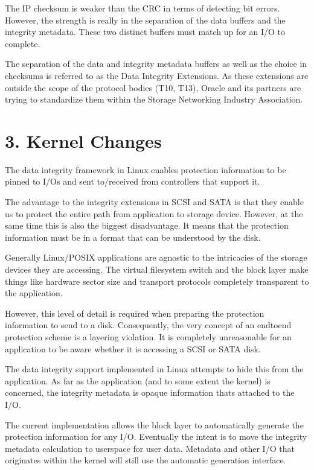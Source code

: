 \documentclass[a4paper,11pt,english]{sphinxmanual}
\begin{document}
The IP checksum is weaker than the CRC in terms of detecting bit
errors.  However, the strength is really in the separation of the data
buffers and the integrity metadata.  These two distinct buffers must
match up for an I/O to complete.

The separation of the data and integrity metadata buffers as well as
the choice in checksums is referred to as the Data Integrity
Extensions.  As these extensions are outside the scope of the protocol
bodies (T10, T13), Oracle and its partners are trying to standardize
them within the Storage Networking Industry Association.


\section{3. Kernel Changes}
\label{\detokenize{data-integrity:kernel-changes}}
The data integrity framework in Linux enables protection information
to be pinned to I/Os and sent to/received from controllers that
support it.

The advantage to the integrity extensions in SCSI and SATA is that
they enable us to protect the entire path from application to storage
device.  However, at the same time this is also the biggest
disadvantage. It means that the protection information must be in a
format that can be understood by the disk.

Generally Linux/POSIX applications are agnostic to the intricacies of
the storage devices they are accessing.  The virtual filesystem switch
and the block layer make things like hardware sector size and
transport protocols completely transparent to the application.

However, this level of detail is required when preparing the
protection information to send to a disk.  Consequently, the very
concept of an end\sphinxhyphen{}to\sphinxhyphen{}end protection scheme is a layering violation.
It is completely unreasonable for an application to be aware whether
it is accessing a SCSI or SATA disk.

The data integrity support implemented in Linux attempts to hide this
from the application.  As far as the application (and to some extent
the kernel) is concerned, the integrity metadata is opaque information
that\textquotesingle{}s attached to the I/O.

The current implementation allows the block layer to automatically
generate the protection information for any I/O.  Eventually the
intent is to move the integrity metadata calculation to userspace for
user data.  Metadata and other I/O that originates within the kernel
will still use the automatic generation interface.
\end{document}
